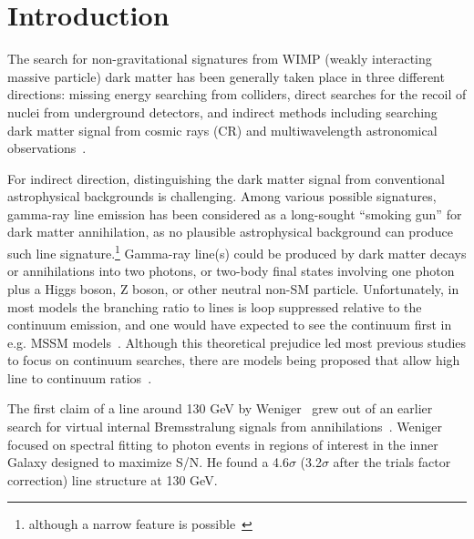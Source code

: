 \documentclass[aps,twocolumn,prd,superscriptaddress,showpacs,nofootinbib,fixfloat]{revtex4}
\begin{document}


\section{Introduction}


The search for non-gravitational signatures from WIMP{}
(weakly interacting massive particle) dark matter has been
generally taken place in three different directions: missing
energy searching from colliders, direct searches for the
recoil of nuclei from underground detectors, and indirect
methods including searching dark matter signal from cosmic
rays (CR) and multiwavelength astronomical
observations~\citep{Jungman:1995df,Bergstrom:2000,Bertone:2005,Hooper:2007Review,
  2012arXiv1205.4882B}.

For indirect direction, distinguishing the dark matter
signal from conventional astrophysical backgrounds is
challenging.  Among various possible signatures, gamma-ray
line emission has been considered as a long-sought ``smoking
gun'' for dark matter annihilation, as no plausible
astrophysical background can produce such line
signature.\footnote{although a narrow feature is
possible~\citep[see][]{2012arXiv1207.0458A}}  Gamma-ray line(s)
could be produced by dark matter decays or annihilations
into two photons, or two-body final states involving one
photon plus a Higgs boson, Z boson, or other neutral non-SM
particle. Unfortunately, in most models the branching ratio
to lines is loop suppressed relative to the continuum
emission, and one would have expected to see the continuum
first in e.g. MSSM models~\citep[e.g.][]{Bergstrom:1997}.
Although this theoretical prejudice led most previous
studies to focus on continuum searches, there are models
being proposed that allow high line to continuum
ratios~\citep[e.g.][]{Bergstrom:1998, Bergstrom:2000,
  Bertone:2009, Jackson:2010, Cline:2012, Weiner:2012}.

The first claim of a line around 130 GeV by 
Weniger~\citep{Weniger:2012} grew
out of an earlier search for virtual internal Bremsstralung signals from
annihilations~\citep{Bringmann:2012}.  Weniger focused on
spectral fitting to photon events in regions of interest 
in the inner Galaxy
designed to maximize S/N.  He found a 4.6$\sigma$
(3.2$\sigma$ after the trials factor correction) line
structure at 130 GeV.
\end{document}
